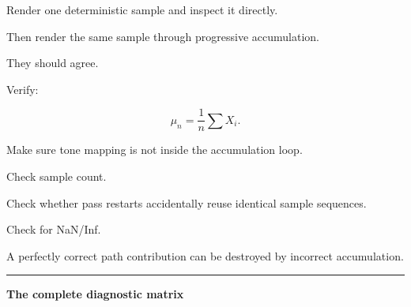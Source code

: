 Render one deterministic sample and inspect it directly.

Then render the same sample through progressive accumulation.

They should agree.

Verify:

\[
\mu_n=
\frac1n
\sum X_i.
\]

Make sure tone mapping is not inside the accumulation loop.

Check sample count.

Check whether pass restarts accidentally reuse identical sample sequences.

Check for NaN/Inf.

A perfectly correct path contribution can be destroyed by incorrect accumulation.

\begin{center}\rule{0.5\linewidth}{0.5pt}\end{center}

\textbf{The complete diagnostic matrix}

